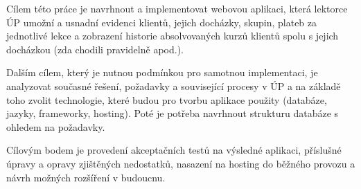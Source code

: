 Cílem této práce je navrhnout a implementovat webovou aplikaci, která lektorce ÚP umožní a usnadní evidenci klientů, jejich docházky, skupin, plateb za jednotlivé lekce a zobrazení historie absolvovaných kurzů klientů spolu s jejich docházkou (zda chodili pravidelně apod.).

Dalším cílem, který je nutnou podmínkou pro samotnou implementaci, je analyzovat současné řešení, požadavky a související procesy v ÚP a na základě toho zvolit technologie, které budou pro tvorbu aplikace použity (databáze, jazyky, frameworky, hosting). Poté je potřeba navrhnout strukturu databáze s ohledem na požadavky.

Cílovým bodem je provedení akceptačních testů na výsledné aplikaci, příslušné úpravy a opravy zjištěných nedostatků, nasazení na hosting do běžného provozu a návrh možných rozšíření v budoucnu.